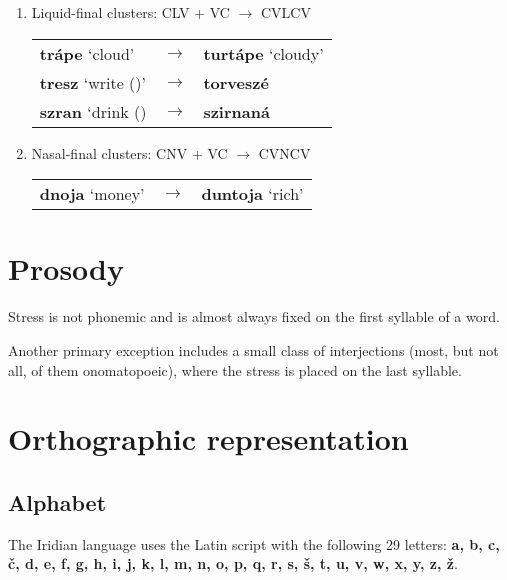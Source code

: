 \begin{enumerate}
	\item Liquid-final clusters: CLV + \glot VC $\rightarrow$ CVLCV
	\begin{center}
	\begin{tabu}to 0.8\textwidth{YM[0.1]Y}
		\textbf{trápe} `cloud'&$\rightarrow$&\textbf{turtápe} `cloudy'\\
		\textbf{tresz} `write ()'&$\rightarrow$&\textbf{torveszé}\\
		\textbf{szran} `drink () &$\rightarrow$&\textbf{szirnaná}\\
	\end{tabu}
	\end{center}

	\item Nasal-final clusters: CNV + \glot VC $\rightarrow$ CVNCV
	\begin{center}
		\begin{tabu}to 0.8\textwidth{YM[0.1]Y}
			\textbf{dnoja} `money'&$\rightarrow$&\textbf{duntoja} `rich'\\
		\end{tabu}
	\end{center}
\end{enumerate}

\section{Prosody}

Stress is not phonemic and is almost always fixed on the first syllable of a word.

Another primary exception includes a small class of interjections (most, but not all, of them onomatopoeic), where the stress is placed on the last syllable.

\section{Orthographic representation}
\subsection{Alphabet}

\par The Iridian language uses the Latin script with the following 29 letters: \textbf{a, b, c, \v{c}, d, e, f, g, h, i, j, k, l, m, n, o, p, q, r, s, \v{s}, t, u, v, w, x, y, z, \v{z}}.

